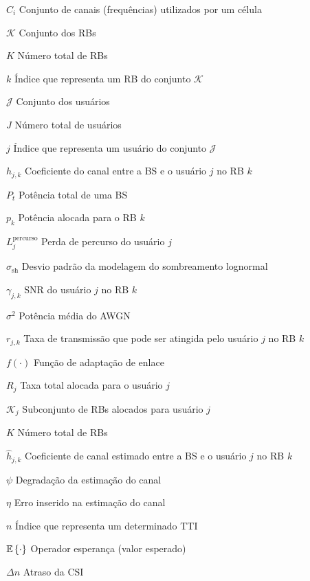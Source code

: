 \begin{simbolos} \setlength{\itemsep}{0.0001\baselineskip} \addtolength{\labelwidth}{1ex}
  \item[$ C_i $] Conjunto de canais (frequências) utilizados por um célula
  \item[$ \mathcal{K} $] Conjunto dos RBs
  \item[$ K $] Número total de RBs
  \item[$ k $] Índice que representa um RB do conjunto $\mathcal{K}$
  \item[$ \mathcal{J} $] Conjunto dos usuários
  \item[$ J $] Número total de usuários
  \item[$ j $] Índice que representa um usuário do conjunto $\mathcal{J}$
  \item[$ h_{j, k} $] Coeficiente do canal entre a BS e o usuário $j$ no RB $k$
  \item[$ P_{t} $] Potência total de uma BS
  \item[$ p_{k} $] Potência alocada para o RB $k$
  \item[$ L_j^{\mathrm{percurso}} $] Perda de percurso do usuário $j$
  \item[$\sigma_{\mathrm{sh}}$] Desvio padrão da modelagem do sombreamento lognormal
  \item[$ \gamma_{j, k} $] SNR do usuário $j$ no RB $k$
  \item[$ \sigma^2 $] Potência média do AWGN
  \item[$ r_{j, k} $] Taxa de transmissão que pode ser atingida pelo usuário $j$ no RB $k$
  \item[$f(\cdot)$] Função de adaptação de enlace
  \item[$ R_j $] Taxa total alocada para o usuário $j$
  \item[$ \mathcal{K}_{j} $] Subconjunto de RBs alocados para usuário $j$
  \item[$ K $] Número total de RBs
  \item[$ \hat{h}_{j, k} $] Coeficiente de canal estimado entre a BS e o usuário $j$ no RB $k$
  \item[$ \psi $] Degradação da estimação do canal
  \item[$ \eta $] Erro inserido na estimação do canal
  \item[$ n $] Índice que representa um determinado TTI
  \item[$ \mathbb{E}\left\{ \cdot \right\} $] Operador esperança (valor esperado)
  \item[$\Delta n$] Atraso da CSI

\end{simbolos}
